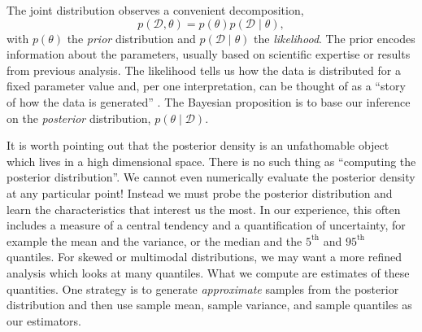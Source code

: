 The joint distribution observes a convenient decomposition,
\begin{equation*}
  p(\mathcal D, \theta) = p(\theta) p(\mathcal D \mid \theta),
\end{equation*}
%
with $p(\theta)$ the \textit{prior} distribution and $p(\mathcal D \mid \theta)$ the \textit{likelihood}.
The prior encodes information about the parameters, usually based on scientific expertise or results from previous analysis.
The likelihood tells us how the data is distributed for a fixed parameter value and, per one interpretation, can be thought of as a ``story of how the data is generated'' \cite{Gelman:2013}.
%
The Bayesian proposition is to base our inference on the \textit{posterior} distribution, $p(\theta \mid \mathcal D)$.


It is worth pointing out that the posterior density is an unfathomable object which lives in a high dimensional space.
There is no such thing as ``computing the posterior distribution''.
We cannot even numerically evaluate the posterior density at any particular point!
Instead we must probe the posterior distribution and learn the characteristics that interest us the most.
In our experience, this often includes a measure of a central tendency and a quantification of uncertainty, for example the mean and the variance, or the median and the $5^\mathrm{th}$ and $95^\mathrm{th}$ quantiles.
For skewed or multimodal distributions, we may want a more refined analysis which looks at many quantiles.
What we compute are estimates of these quantities.
One strategy is to generate \textit{approximate} samples from the posterior distribution and then use sample mean, sample variance, and sample quantiles as our estimators.


